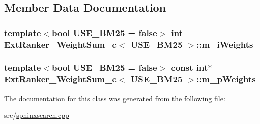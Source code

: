 \subsection{Member Data Documentation}
\hypertarget{classExtRanker__WeightSum__c_ae076f6845e3d8966a9e3c38975bf7d17}{
\subsubsection[{m\-\_\-i\-Weights}]{\setlength{\rightskip}{0pt plus 5cm}template$<$bool U\-S\-E\-\_\-\-B\-M25 = false$>$ {\bf int} {\bf Ext\-Ranker\-\_\-\-Weight\-Sum\-\_\-c}$<$ U\-S\-E\-\_\-\-B\-M25 $>$\-::m\-\_\-i\-Weights\hspace{0.3cm}{\ttfamily [protected]}}}\label{classExtRanker__WeightSum__c_ae076f6845e3d8966a9e3c38975bf7d17}
\hypertarget{classExtRanker__WeightSum__c_a929c9c18cff29866e4c110c9a2786b71}{
\subsubsection[{m\-\_\-p\-Weights}]{\setlength{\rightskip}{0pt plus 5cm}template$<$bool U\-S\-E\-\_\-\-B\-M25 = false$>$ const {\bf int}$\ast$ {\bf Ext\-Ranker\-\_\-\-Weight\-Sum\-\_\-c}$<$ U\-S\-E\-\_\-\-B\-M25 $>$\-::m\-\_\-p\-Weights\hspace{0.3cm}{\ttfamily [protected]}}}\label{classExtRanker__WeightSum__c_a929c9c18cff29866e4c110c9a2786b71}


The documentation for this class was generated from the following file\-:\begin{DoxyCompactItemize}
\item 
src/\hyperlink{sphinxsearch_8cpp}{sphinxsearch.\-cpp}\end{DoxyCompactItemize}
